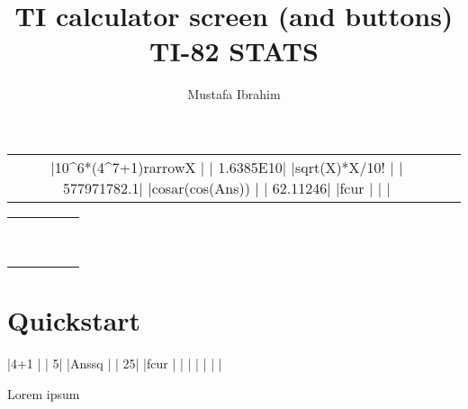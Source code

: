 \documentclass[a4paper,12pt]{article}
\title{TI calculator screen (and buttons)\\{\small TI-82 STATS}}
\author{Mustafa Ibrahim}
\begin{document}
\maketitle

\begin{center}
	\begin{tabular}{cc}
		\tiscreen
		|10^6*(4^7+1){rarrow}X  |
		|       1.6385E10|
		|{sqrt}(X)*X/10!      |
		|     577971782.1|
		|cos{ar}(cos(Ans))  |
		|        62.11246|
		|{fcur}               |
		|                |
		&
		\tibtnextramatrix
	\end{tabular}

	\dotfill

	\begin{tabular}{ccccc}
		\tibtnsecond & \tibtnmode   & \tibtndel       &                  &             \\
		\tibtnalpha  & \tibtnxton   & \tibtnstat      &                  &             \\
		\tibtnmath   & \tibtnmatrix & \tibtnprgm      & \tibtnvars       & \tibtnclear \\
		\tibtnxnone  & \tibtnsin    & \tibtncos       & \tibtntan        & \tibtnpower \\
		\tibtnxtwo   & \tibtncomma  & \tibtnleftparen & \tibtnrightparen & \tibtndiv   \\
		\tibtnlog    & \tibtnseven  & \tibtneight     & \tibtnnine       & \tibtntimes \\
		\tibtnln     & \tibtnfour   & \tibtnfive      & \tibtnsix        & \tibtnminus \\
		\tibtnsto    & \tibtnone    & \tibtntwo       & \tibtnthree      & \tibtnplus  \\
		\tibtnon     & \tibtnzero   & \tibtndot       & \tibtnneg        & \tibtnenter \\
	\end{tabular}
\end{center}

\newpage\tableofcontents\newpage

\section{Quickstart}

\begin{SideBySideExample}[xrightmargin=5.5cm]

\tiscreen
|4+1             |
|               5|
|Ans{sq}         |
|              25|
|{fcur}          |
|                |
|                |
|                |

Lorem \tibtnmath{} ipsum

\tibtnextramath
\end{SideBySideExample}
\end{document}
